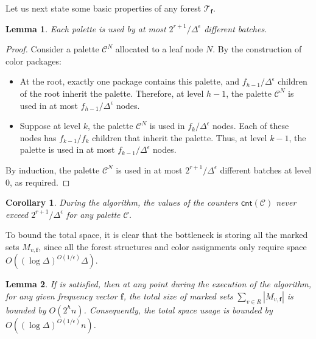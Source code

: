 \documentclass[11pt,a4paper]{article}
\newtheorem{lemma}{Lemma}[section]
\newtheorem{corollary}{Corollary}[section]
\newcommand{\tree}{\mathcal{T}}
\newcommand{\freq}{\mathbf{f}}
\newcommand{\clr}{\mathcal{C}}
\newcommand{\cnt}{\mathsf{cnt}}
\newcommand{\brac}[1]{\left(#1\right)}
\begin{document}
Let us next state some basic properties of any forest $\tree_{\freq}$. 
\begin{lemma}
	Each palette is used by at most $2^{r+1} / \Delta^\epsilon$ different batches.
\end{lemma}
\begin{proof}
	Consider a palette $\clr^N$ allocated to a leaf node $N$. By the construction of color packages:
	\begin{itemize}
		\item At the root, exactly one package contains this palette, and $ f_{h - 1} / \Delta^\epsilon $ children of the root inherit the palette. Therefore, at level $h - 1$, the palette $\clr^N$ is used in at most $ f_{h - 1} / \Delta^\epsilon $ nodes.
		\item Suppose at level \(k\), the palette \(\clr^N\) is used in \( f_k / \Delta^\epsilon \) nodes. Each of these nodes has \( f_{k-1} / f_k \) children that inherit the palette. Thus, at level \(k-1\), the palette is used in at most \( f_{k-1} / \Delta^\epsilon \) nodes.
	\end{itemize}
	By induction, the palette \(\clr^N\) is used in at most \( 2^{r+1} / \Delta^\epsilon \) different batches at level 0, as required. 
\end{proof}

\begin{corollary}\label{cnt-bound}
	During the algorithm, the values of the counters $\cnt(\clr)$ never exceed $2^{r+1} / \Delta^\epsilon$ for any palette $\clr$.
\end{corollary}

To bound the total space, it is clear that the bottleneck is storing all the marked sets \(M_{v, \freq}\), since all the forest structures and color assignments only require space \(O\brac{(\log\Delta)^{O(1/\epsilon)}\Delta}\).

\begin{lemma}
    If  is satisfied, then at any point during the execution of the algorithm, for any given frequency vector $\freq$, the total size of marked sets $\sum_{v\in R}|M_{v, \freq}|$ is bounded by $O(2^h n)$. Consequently, the total space usage is bounded by $O((\log\Delta)^{O(1/\epsilon)} n)$.
\end{lemma}
\end{document}
